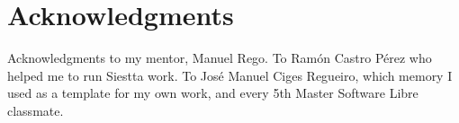 \chapter{Acknowledgments}

Acknowledgments to my mentor, Manuel Rego. 
To Ram\'on Castro P\'erez who helped me to run Siestta work. 
To Jos\'e Manuel Ciges Regueiro, which memory I used as a template for my own work, and every 5th Master Software Libre classmate.          
